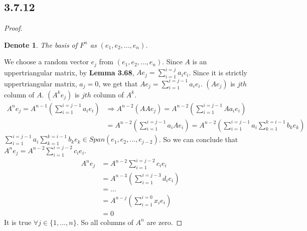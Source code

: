 \documentclass{article}
\newtheorem*{denote}{Denote}
\newtheorem*{proof}{Proof}
\begin{document}
\subsection*{3.7.12}
\begin{proof}
    \begin{denote}
        The basis of $F^n$ as $(e_1, e_2, ..., e_n)$.
    \end{denote}
    We choose a random vector $e_j$ from $(e_1, e_2, ..., e_n)$. Since $A$ is an uppertriangular matrix, by \textbf{Lemma 3.68}, 
    $Ae_j = \sum_{i = 1}^{i = j} a_ie_i$. Since it is strictly uppertriangular matrix, $a_j = 0$, we get that $Ae_j = \sum_{i = 1}^{i = j - 1} a_ie_i$. 
    $(Ae_j)$ is $jth$ column of $A$. $(A^ke_j)$ is $jth$ column of $A^k$.
    \begin{equation*}
        \begin{split}
            A^ne_j = A^{n-1}(\sum_{i = 1}^{i = j - 1} a_ie_i) &\Rightarrow A^{n-2}(AAe_j) = A^{n-2}(\sum_{i = 1}^{i = j - 1} Aa_ie_i) \\
                   &= A^{n-2}(\sum_{i = 1}^{i = j - 1} a_iAe_i) = A^{n-2}(\sum_{i = 1}^{i = j - 1} a_i\sum_{k = 1}^{k = i - 1} b_ke_k)
        \end{split}
    \end{equation*}
    $\sum_{i = 1}^{i = j - 1} a_i\sum_{k = 1}^{k = i - 1} b_ke_k \in Span(e_1, e_2, ..., e_{j-2})$.
    So we can conclude that $A^ne_j = A^{n-2}\sum_{i = 1}^{i = j - 2}c_ie_i$.
    \begin{equation*}
        \begin{split}
            A^ne_j &= A^{n-2}\sum_{i = 1}^{i = j - 2}c_ie_i \\
                   &= A^{n-3}(\sum_{i = 1}^{i = j - 3} d_ie_i) \\
                   &= ... \\
                   &= A^{n-j}(\sum_{i = 1}^{i = 0} x_ie_i) \\
                   & = 0
        \end{split}
    \end{equation*}
    It is true $\forall j \in \{1, ..., n \}$. So all columns of $A^n$ are zero.
\end{proof}
\end{document}
